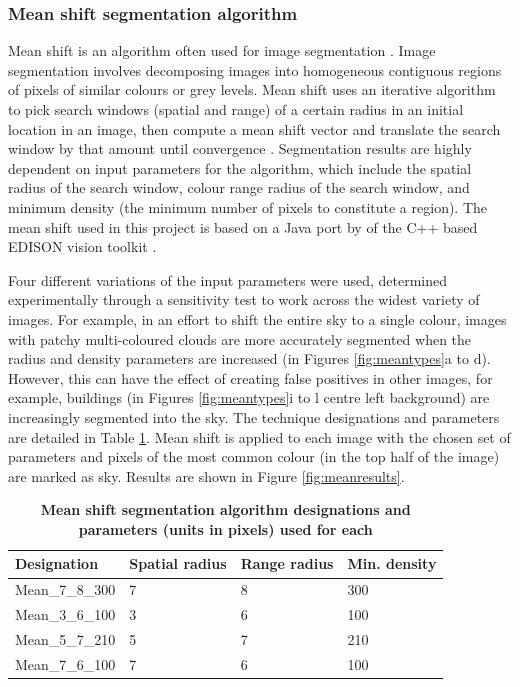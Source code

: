 \documentclass[final,3p,times,authoryear]{elsarticle}
\begin{document}
\subsubsection{Mean shift segmentation algorithm}\label{sec:mean}

Mean shift is an algorithm often used for image segmentation \citep{Comaniciu1997,Comaniciu2002}. Image segmentation involves decomposing images into homogeneous contiguous regions of pixels of similar colours or grey levels. Mean shift uses an iterative algorithm to pick search windows (spatial and range) of a certain radius in an initial location in an image, then compute a mean shift vector and translate the search window by that amount until convergence \citep{Comaniciu1997}. Segmentation results are highly dependent on input parameters for the algorithm, which include the spatial radius of the search window, colour range radius of the search window, and minimum density (the minimum number of pixels to constitute a region). The mean shift used in this project is based on a Java port by \cite{Pangburn2002} of the C++ based EDISON vision toolkit \citep{Christoudias2002}. 

Four different variations of the input parameters were used, determined experimentally through a sensitivity test to work across the widest variety of images. For example, in an effort to shift the entire sky to a single colour, images with patchy multi-coloured clouds are more accurately segmented when the radius and density parameters are increased (in Figures \ref{fig:meantypes}a to d). However, this can have the effect of creating false positives in other images, for example, buildings (in Figures \ref{fig:meantypes}i to l centre left background) are increasingly segmented into the sky. The technique designations and parameters are detailed in Table \ref{tab:techniques2}. Mean shift is applied to each image with the chosen set of parameters and pixels of the most common colour (in the top half of the image) are marked as sky. Results are shown in Figure \ref{fig:meanresults}.


\begin{table}[!htbp]
\caption{\bf Mean shift segmentation algorithm designations and parameters (units in pixels) used for each \label{tab:techniques2}}     
\begin{tabular}{ l l l l}
\textbf{Designation}  & \textbf{Spatial radius}&\textbf{Range radius}&\textbf{Min. density}   \\ \hline
Mean\_7\_8\_300 & 7& 8& 300 \\
Mean\_3\_6\_100	& 3& 6& 100 \\
Mean\_5\_7\_210	& 5& 7& 210 \\	 
Mean\_7\_6\_100	& 7& 6& 100 \\

\hline
\end{tabular}
\end{table}
\end{document}
